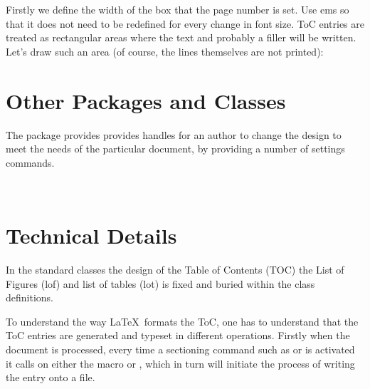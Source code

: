 


Firstly we define the width of the box that the page number is set. Use ems so that it does not need to be redefined for every change in font size.
ToC entries are treated as rectangular areas where the text
and probably a filler will be written. Let's draw such an
area (of course, the lines themselves are not printed):



\section{Other Packages and Classes}
The package  provides  provides handles for an author to change the design to meet the needs of the particular document, by providing a number of settings commands.


^^A

\section{Technical Details}
In the standard classes the design of the Table of Contents (TOC) the List of Figures (lof) and list of tables (lot) is fixed and buried within the class definitions.

To understand the way \LaTeX\ formats the ToC, one has to understand that the ToC entries are generated and typeset in different operations. Firstly when the document is processed, every time a sectioning command such as  or  is activated it calls on either the macro  or , which in turn will initiate the process of writing the entry onto a file.

